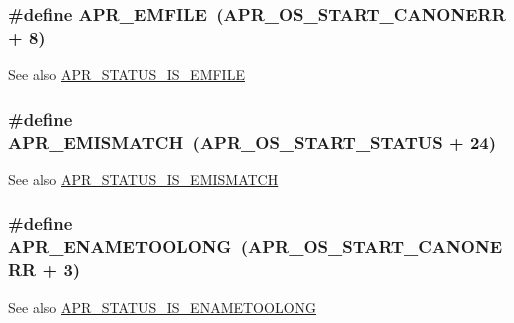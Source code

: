\subsubsection[{\texorpdfstring{A\+P\+R\+\_\+\+E\+M\+F\+I\+LE}{APR_EMFILE}}]{\setlength{\rightskip}{0pt plus 5cm}\#define A\+P\+R\+\_\+\+E\+M\+F\+I\+LE~({\bf A\+P\+R\+\_\+\+O\+S\+\_\+\+S\+T\+A\+R\+T\+\_\+\+C\+A\+N\+O\+N\+E\+RR} + 8)}\hypertarget{group__APR__Error_gaec391eaf0bfa6aed03457ed3f796942d}{}\label{group__APR__Error_gaec391eaf0bfa6aed03457ed3f796942d}
\begin{DoxySeeAlso}{See also}
\hyperlink{group__APR__STATUS__IS_gae50825e6293023c570a92d185b38e393}{A\+P\+R\+\_\+\+S\+T\+A\+T\+U\+S\+\_\+\+I\+S\+\_\+\+E\+M\+F\+I\+LE} 
\end{DoxySeeAlso}
\subsubsection[{\texorpdfstring{A\+P\+R\+\_\+\+E\+M\+I\+S\+M\+A\+T\+CH}{APR_EMISMATCH}}]{\setlength{\rightskip}{0pt plus 5cm}\#define A\+P\+R\+\_\+\+E\+M\+I\+S\+M\+A\+T\+CH~({\bf A\+P\+R\+\_\+\+O\+S\+\_\+\+S\+T\+A\+R\+T\+\_\+\+S\+T\+A\+T\+US} + 24)}\hypertarget{group__APR__Error_ga31e65a44daba96aa6d943529e94498e7}{}\label{group__APR__Error_ga31e65a44daba96aa6d943529e94498e7}
\begin{DoxySeeAlso}{See also}
\hyperlink{group__APR__STATUS__IS_ga7234b0d01a8e3ea8e5345f3f242df030}{A\+P\+R\+\_\+\+S\+T\+A\+T\+U\+S\+\_\+\+I\+S\+\_\+\+E\+M\+I\+S\+M\+A\+T\+CH} 
\end{DoxySeeAlso}
\subsubsection[{\texorpdfstring{A\+P\+R\+\_\+\+E\+N\+A\+M\+E\+T\+O\+O\+L\+O\+NG}{APR_ENAMETOOLONG}}]{\setlength{\rightskip}{0pt plus 5cm}\#define A\+P\+R\+\_\+\+E\+N\+A\+M\+E\+T\+O\+O\+L\+O\+NG~({\bf A\+P\+R\+\_\+\+O\+S\+\_\+\+S\+T\+A\+R\+T\+\_\+\+C\+A\+N\+O\+N\+E\+RR} + 3)}\hypertarget{group__APR__Error_ga3db63b16c2b332efe441e2661f593377}{}\label{group__APR__Error_ga3db63b16c2b332efe441e2661f593377}
\begin{DoxySeeAlso}{See also}
\hyperlink{group__APR__STATUS__IS_gad39fb68ea626722634f81a764b3626df}{A\+P\+R\+\_\+\+S\+T\+A\+T\+U\+S\+\_\+\+I\+S\+\_\+\+E\+N\+A\+M\+E\+T\+O\+O\+L\+O\+NG} 
\end{DoxySeeAlso}
